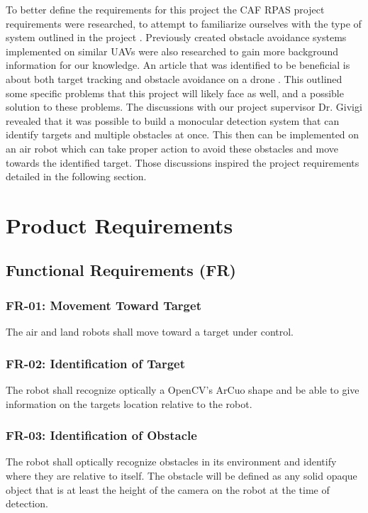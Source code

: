 \documentclass{article}
\begin{document}
	To better define the requirements for this project the CAF RPAS project requirements were researched, to attempt to familiarize ourselves with the type of system outlined in the project \cite{RPAS}. Previously created obstacle avoidance systems implemented on similar UAVs were also researched to gain more background information for our knowledge. An article that was identified to be beneficial is about both target tracking and obstacle avoidance on a drone \cite{woods2015dynamic}. This outlined some specific problems that this project will likely face as well, and a possible solution to these problems. 
	The discussions with our project supervisor Dr. Givigi revealed that it was possible to build a monocular detection system that can identify targets and multiple obstacles at once. This then can be implemented on an air robot which can take proper action to avoid these obstacles and move towards the identified target. Those discussions inspired the project requirements detailed in the following section.

\section{Product Requirements}

	\subsection{Functional Requirements (FR)}
		
		\subsubsection{FR-01: Movement Toward Target}
		The air and land robots shall move toward a target under control.
		
		\subsubsection{FR-02: Identification of Target}
		The robot shall recognize optically a OpenCV's ArCuo shape and be able to give information on the targets location relative to the robot. 

		\subsubsection{FR-03: Identification of Obstacle}
		The robot shall optically recognize obstacles in its environment and identify where they are relative to itself. The obstacle will be defined as any solid opaque object that is at least the height of the camera on the robot at the time of detection.
		
\end{document}
